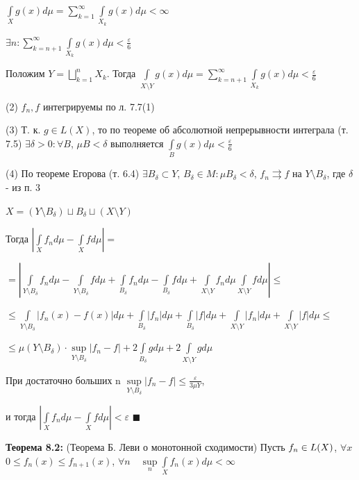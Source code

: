 \documentclass[a4paper]{report}
\newcommand*{\hm}[1]{#1\nobreak\discretionary{}%
            {\hbox{$\mathsurround=0pt #1$}}{}}
\begin{document}
$\displaystyle\int\limits_X g(x)d\mu=\sum\limits_{k=1}^\infty\displaystyle\int\limits_{X_k}g(x)d\mu<\infty$

$\exists n\colon\sum\limits_{k=n+1}^\infty\displaystyle\int\limits_{X_k} g(x)d\mu<\frac\varepsilon6$

Положим $Y=\bigsqcup\limits_{k=1}^n X_k$. Тогда $\displaystyle\int\limits_{X\setminus Y}g(x)d\mu=\sum\limits_{k=n+1}^\infty\displaystyle\int\limits_{X_k} g(x)d\mu<\frac\varepsilon6$

(2) $f_n,f$ интегрируемы по л. 7.7(1)

(3) Т. к. $g\in L(X)$, то по теореме об абсолютной непрерывности интеграла (т. 7.5) $\exists\delta>0\colon\forall B$, $\mu B<\delta$ выполняется $\displaystyle\int\limits_B g(x)
d\mu<\frac\varepsilon6$

(4) По теореме Егорова (т. 6.4) $\exists B_\delta\subset Y$, $B_\delta\in M\colon \mu B_\delta<\delta$, $f_n\rightrightarrows f$ на $Y\setminus B_\delta$, где
$\delta$ - из п. 3

$X=(Y\setminus B_\delta)\sqcup B_\delta\sqcup(X\setminus Y)$

Тогда $\left|\displaystyle\int\limits_X f_n d\mu-\displaystyle\int\limits_X fd\mu\right|=$

\noindent $=\left|\displaystyle\int\limits_{Y\setminus B_\delta}f_n d\mu-\displaystyle\int\limits_{Y\setminus B_\delta}fd\mu+\displaystyle\int\limits_{B_\delta}f_nd\mu-\displaystyle\int\limits_{B_\delta}fd\mu+\displaystyle\int\limits_{X\setminus Y}f_nd\mu \displaystyle\int\limits_{X\setminus Y}fd\mu\right|\le$

\noindent $\le\displaystyle\int\limits_{Y\setminus B_\delta}|f_n(x)-f(x)|d\mu+\displaystyle\int\limits_{B_\delta}|f_n|d\mu+\displaystyle\int\limits_{B_\delta}|f|d\mu+\displaystyle\int\limits_{X\setminus Y}|f_n|d\mu+\displaystyle\int\limits_{X\setminus Y}|f|d\mu\le$

\noindent $\le\mu(Y\setminus B_\delta)\cdot\sup\limits_{Y\setminus B_\delta}|f_n-f|+2\displaystyle\int\limits_{B_\delta}gd\mu+2\displaystyle\int\limits_{X\setminus Y}gd\mu$

 При достаточно больших n $\sup\limits_{Y\setminus B_\delta}|f_n-f|\le\displaystyle\frac{\varepsilon}{3\mu Y}$,

и тогда $\left|\displaystyle\int\limits_X f_nd\mu-\displaystyle\int\limits_Xfd\mu\right|<\varepsilon$ $\blacksquare$
\bigskip

\noindent\textbf{Теорема 8.2:} (Теорема Б. Леви о монотонной сходимости) Пусть $f_n\hm\in L(X)$, $\forall x$ $0\le f_n(x)\le f_{n+1}(x)$, $\forall n\quad\sup\limits_n
\displaystyle\int\limits_X f_n(x)d\mu<\infty$
\end{document}
